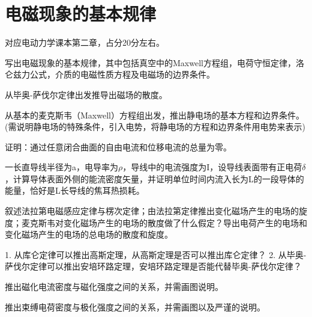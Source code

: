 \section{电磁现象的基本规律}
对应电动力学课本第二章，占分20分左右。

\begin{question}
写出电磁现象的基本规律，其中包括真空中的Maxwell方程组，电荷守恒定律，洛仑兹力公式，介质的电磁性质方程及电磁场的边界条件。
\end{question}

\begin{question} 
从毕奥-萨伐尔定律出发推导出磁场的散度。
\end{question}

\begin{question} 
从基本的麦克斯韦（Maxwell）方程组出发，推出静电场的基本方程和边界条件。
(需说明静电场的特殊条件，引入电势，将静电场的方程和边界条件用电势来表示)
\end{question}

\begin{question} 
证明：通过任意闭合曲面的自由电流和位移电流的总量为零。
\end{question}

\begin{question} 
一长直导线半径为a，电导率为$\rho$，导线中的电流强度为I，设导线表面带有正电荷$\delta$
，计算导体表面外侧的能流密度矢量，并证明单位时间内流入长为L的一段导体的能量，恰好是L长导线的焦耳热损耗。
\end{question}

\begin{question}
叙述法拉第电磁感应定律与楞次定律；由法拉第定律推出变化磁场产生的电场的旋度；麦克斯韦对变化磁场产生的电场的散度做了什么假定？导出电荷产生的电场和变化磁场产生的电场的总电场的散度和旋度。
\end{question}

\begin{question}
1. 从库仑定律可以推出高斯定理，从高斯定理是否可以推出库仑定律？
2. 从毕奥-萨伐尔定律可以推出安培环路定理，安培环路定理是否能代替毕奥-萨伐尔定律？
\end{question}

\begin{question}
推出磁化电流密度与磁化强度之间的关系，并需画图说明。
\end{question}

\begin{question} 
推出束缚电荷密度与极化强度之间的关系，并需画图以及严谨的说明。
\end{question}

